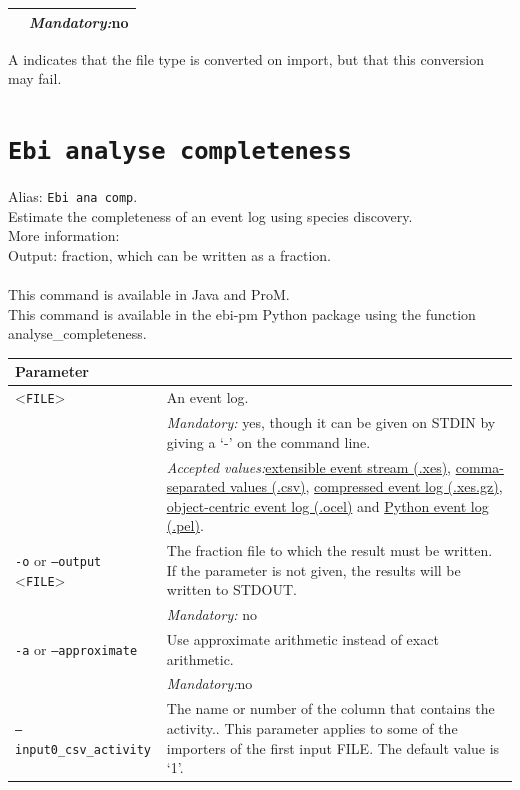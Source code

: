 {\begin{tabularx}{\linewidth}{lX}
&\textit{Mandatory:}\quad no\\
\bottomrule
\end{tabularx}
A \textdagger{} indicates that the file type is converted on import, but that this conversion may fail.
\clearpage\section{\texttt{Ebi analyse completeness}}
\label{command:Ebi analyse completeness}
Alias: \texttt{Ebi ana comp}.\\
Estimate the completeness of an event log using species discovery.\\
More information: ~\cite{DBLP:conf/icpm/KabierskiRW23}~\\
\noindent Output: fraction, which can be written as a fraction.\\
\\This command is available in Java and ProM.
\\This command is available in the ebi-pm Python package using the function analyse\_completeness.
\begin{tabularx}{\linewidth}{lX}
\toprule
Parameter \\\midrule
<\texttt{FILE}>&An event log.\\
&\textit{Mandatory:} \quad yes, though it can be given on STDIN by giving a `-' on the command line.\\
&\textit{Accepted values:}\quad \hyperref[filehandler:extensible event stream]{extensible event stream (.xes)}, \hyperref[filehandler:comma-separated values]{comma-separated values (.csv)}, \hyperref[filehandler:compressed event log]{compressed event log (.xes.gz)}, \hyperref[filehandler:object-centric event log]{object-centric event log (.ocel)} and \hyperref[filehandler:Python event log]{Python event log (.pel)}.\\
\texttt{-o} or \texttt{--output} <\texttt{FILE}> &
The fraction file to which the result must be written. If the parameter is not given, the results will be written to STDOUT.\\
&\textit{Mandatory:} \quad no\\
\texttt{-a} or \texttt{--approximate} & Use approximate arithmetic instead of exact arithmetic.\\
&\textit{Mandatory:}\quad no\\
\texttt{--input0\_csv\_activity} & The name or number of the column that contains the activity.. This parameter applies to some of the importers of the first input FILE. The default value is `1'.\\

\end{tabularx}}

